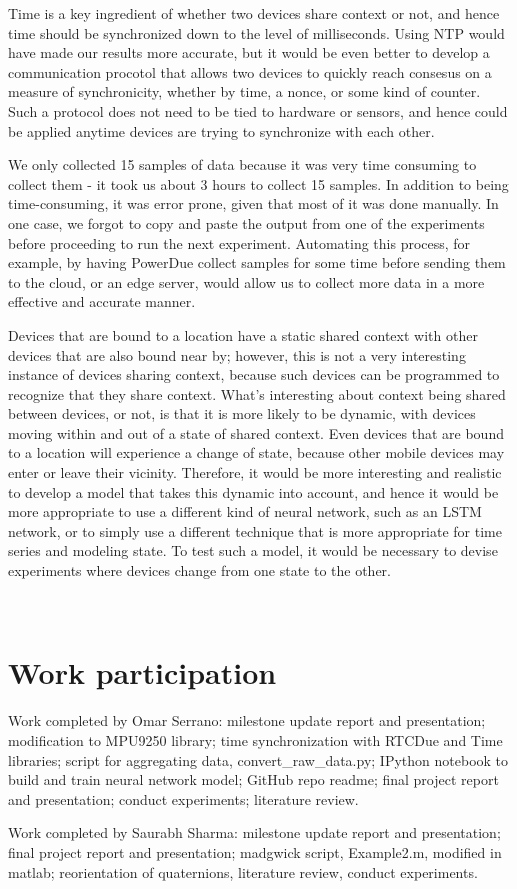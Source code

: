 \documentclass[journal]{IEEEtranTIE}
\begin{document}
Time is a key ingredient of whether two devices share context or not, and hence
time should be synchronized down to the level of milliseconds. Using NTP would
have made our results more accurate, but it would be even better to develop a
communication procotol that allows two devices to quickly reach consesus on a
measure of synchronicity, whether by time, a nonce, or some kind of counter.
Such a protocol does not need to be tied to hardware or sensors, and hence could
be applied anytime devices are trying to synchronize with each other.

We only collected 15 samples of data because it was very time consuming to
collect them - it took us about 3 hours to collect 15 samples. In addition to
being time-consuming, it was error prone, given that most of it was done
manually. In one case, we forgot to copy and paste the output from one of the
experiments before proceeding to run the next experiment. Automating this
process, for example, by having PowerDue collect samples for some time before
sending them to the cloud, or an edge server, would allow us to collect more
data in a more effective and accurate manner.

Devices that are bound to a location have a static shared context with other
devices that are also bound near by; however, this is not a very interesting
instance of devices sharing context, because such devices can be programmed to
recognize that they share context. What's interesting about context being shared
between devices, or not, is that it is more likely to be dynamic, with devices
moving within and out of a state of shared context. Even devices that are bound
to a location will experience a change of state, because other mobile devices
may enter or leave their vicinity. Therefore, it would be more interesting and
realistic to develop a model that takes this dynamic into account, and hence it
would be more appropriate to use a different kind of neural network, such as an
LSTM network, or to simply use a different technique that is more appropriate
for time series and modeling state. To test such a model, it would be necessary
to devise experiments where devices change from one state to the other.



\ %

\appendix
\section{Work participation}
Work completed by Omar Serrano: milestone update report and presentation;
modification to MPU9250 library; time synchronization with RTCDue and Time
libraries; script for aggregating data, convert\_raw\_data.py; IPython notebook
to build and train neural network model; GitHub repo readme; final project
report and presentation; conduct experiments; literature review.

Work completed by Saurabh Sharma: milestone update report and presentation;
final project report and presentation; madgwick script, Example2.m, modified in
matlab; reorientation of quaternions, literature review, conduct experiments.
\end{document}
